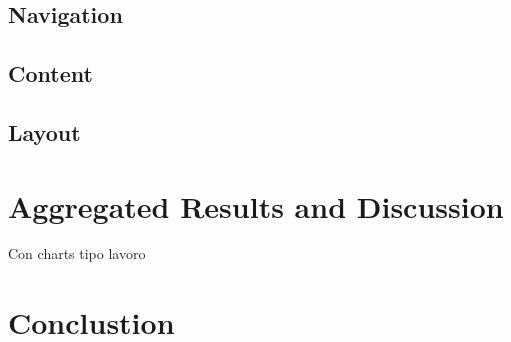 \documentclass[11pt, a4paperm, hidelinks]{article}
\begin{document}
	\subsection{Navigation}

	\subsection{Content}

	\subsection{Layout}


	\section{Aggregated Results and Discussion}
Con charts tipo lavoro


	\section{Conclustion}


	\appendix
\end{document}
